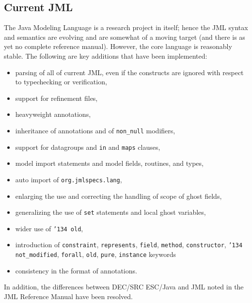 \documentclass{acm_proc_article-sp}
\begin{document}
\subsection{Current JML}
The Java Modeling Language is a research project in itself; hence the
JML syntax and semantics are evolving and are somewhat of a moving
target (and there is as yet no complete reference manual).  However,
the core language is reasonably stable.  The following are key
additions that have been implemented:
\setlength{\partopsep}{0in}\setlength{\parskip}{0in}\setlength{\itemsep}{0in}\setlength{\topsep}{0in}
\begin{itemize}
\setlength{\partopsep}{0in}\setlength{\parskip}{0in}\setlength{\itemsep}{0in}\setlength{\topsep}{0in}
\item parsing of all of current JML, even if the constructs are
  ignored with respect to typechecking or verification,
\item support for refinement files,
\item heavyweight annotations,
\item inheritance of annotations and of \texttt{non\_null}
  modifiers, 
\item support for datagroups and \texttt{in} and \texttt{maps} clauses,
\item model import statements and model fields, routines, and types, 
\item auto import of \texttt{org.jmlspecs.lang},
\item enlarging the use and correcting the handling of scope of ghost fields,
\item generalizing the use of \texttt{set} statements and local ghost variables,
\item wider use of \texttt{\char'134 old},
\item introduction of \texttt{constraint}, \texttt{represents}, \texttt{field}, \texttt{method},
\texttt{constructor}, \texttt{\char'134 not\_modified}, \texttt{forall}, \texttt{old}, \texttt{pure}, \texttt{instance} keywords
\item consistency in the format of annotations.
\end{itemize}
In addition, the differences between DEC/SRC ESC/Java and JML noted in the JML
Reference Manual have been resolved.
\end{document}
